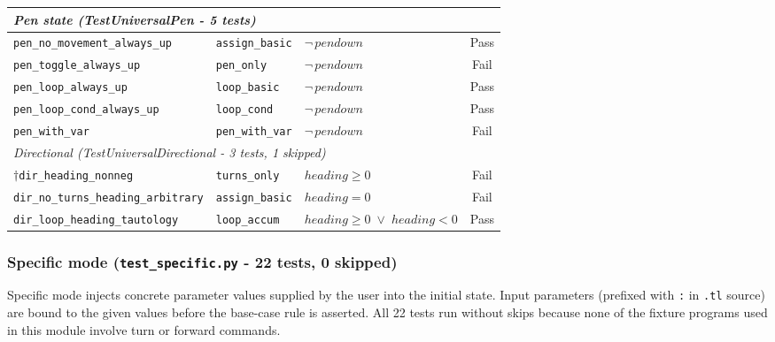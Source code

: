 {\begin{longtable}{p{} p{} p{} c}
\midrule
\multicolumn{4}{l}{\textit{Pen state (TestUniversalPen - 5 tests)}} \\
\midrule
\texttt{pen\_no\_movement\_always\_up}     & \texttt{assign\_basic}   & $\neg\,\mathit{pendown}$  & Pass \\
\texttt{pen\_toggle\_always\_up}           & \texttt{pen\_only}       & $\neg\,\mathit{pendown}$  & Fail \\
\texttt{pen\_loop\_always\_up}             & \texttt{loop\_basic}     & $\neg\,\mathit{pendown}$  & Pass \\
\texttt{pen\_loop\_cond\_always\_up}       & \texttt{loop\_cond}      & $\neg\,\mathit{pendown}$  & Pass \\
\texttt{pen\_with\_var}                    & \texttt{pen\_with\_var}  & $\neg\,\mathit{pendown}$  & Fail \\

\midrule
\multicolumn{4}{l}{\textit{Directional (TestUniversalDirectional - 3 tests, 1 skipped)}} \\
\midrule
$\dagger$\;\texttt{dir\_heading\_nonneg}   & \texttt{turns\_only}     & $\mathit{heading} \geq 0$ & Fail \\
\texttt{dir\_no\_turns\_heading\_arbitrary} & \texttt{assign\_basic}  & $\mathit{heading} = 0$   & Fail \\
\texttt{dir\_loop\_heading\_tautology}     & \texttt{loop\_accum}     & $\mathit{heading} \geq 0 \;\lor\; \mathit{heading} < 0$ & Pass \\

\end{longtable}
}

\subsubsection*{Specific mode \textnormal{(\texttt{test\_specific.py} - 22 tests, 0 skipped)}}

Specific mode injects concrete parameter values supplied by the user into the
initial state.  Input parameters (prefixed with \texttt{:} in \texttt{.tl} source)
are bound to the given values before the base-case rule is asserted.
All 22 tests run without skips because none of the fixture programs used in this
module involve turn or forward commands.

